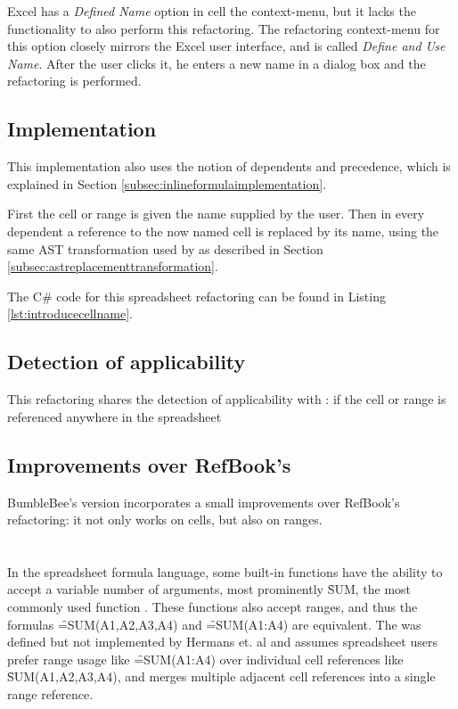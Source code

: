Excel has a \emph{Defined Name} option in cell the context-menu, but it lacks the functionality to also perform this refactoring.
The refactoring context-menu for this option closely mirrors the Excel user interface, and is called \emph{Define and Use Name}.
After the user clicks it, he enters a new name in a dialog box and the refactoring is performed.

\subsection{Implementation}

This implementation also uses the notion of dependents and precedence, which is explained in Section \ref{subsec:inlineformulaimplementation}.

First the cell or range is given the name supplied by the user.
Then in every dependent a reference to the now named cell is replaced by its name, using the same AST transformation used by  as described in Section \ref{subsec:astreplacementtransformation}.

The C\# code for this spreadsheet refactoring can be found in Listing \ref{lst:introducecellname}.

\subsection{Detection of applicability}

This refactoring shares the detection of applicability with : if the cell or range is referenced anywhere in the spreadsheet 

\subsection{Improvements over RefBook's }

BumbleBee's version incorporates a small improvements over RefBook's refactoring: it not only works on cells, but also on ranges.

\section{}
\label{refac:groupreferences}

In the spreadsheet formula language, some built-in functions have the ability to accept a variable number of arguments, most prominently \f{SUM}, the most commonly used function \cite{hermans2015enron}.
These functions also accept ranges, and thus the formulas \f{=SUM(A1,A2,A3,A4)} and \f{=SUM(A1:A4)} are equivalent.
The  was defined but not implemented by Hermans et. al \cite{hermans2014detecting} and assumes spreadsheet users prefer range usage like \f{=SUM(A1:A4)} over individual cell references like \f{SUM(A1,A2,A3,A4)}, and merges multiple adjacent cell references into a single range reference.


